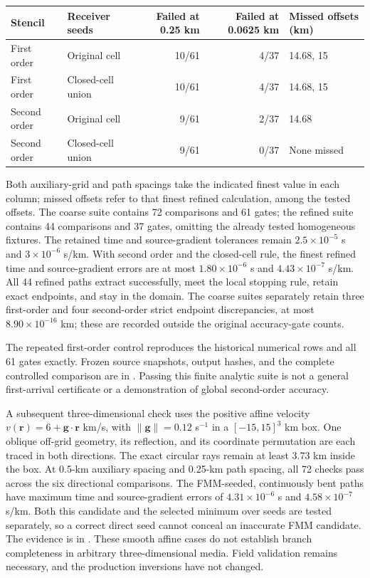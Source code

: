 \documentclass[11pt]{article}
\begin{document}
\begin{center}
\begin{tabular}{llrrl}
\toprule
Stencil & Receiver seeds & Failed at 0.25 km & Failed at 0.0625 km & Missed offsets (km)\\
\midrule
First order & Original cell & 10/61 & 4/37 & 14.68, 15\\
First order & Closed-cell union & 10/61 & 4/37 & 14.68, 15\\
Second order & Original cell & 9/61 & 2/37 & 14.68\\
Second order & Closed-cell union & 9/61 & 0/37 & None missed\\
\bottomrule
\end{tabular}
\end{center}
Both auxiliary-grid and path spacings take the indicated finest value in
each column; missed offsets refer to that finest refined calculation,
among the tested offsets.
The coarse suite contains 72 comparisons and 61 gates; the refined suite
contains 44 comparisons and 37 gates, omitting the already tested homogeneous
fixtures. The retained time and source-gradient tolerances remain
$2.5\times10^{-5}$ s and $3\times10^{-6}$ s/km.
With second order and the closed-cell rule, the finest refined time and
source-gradient errors are at most $1.80\times10^{-6}$ s and
$4.43\times10^{-7}$ s/km. All 44 refined paths extract successfully,
meet the local stopping rule, retain exact endpoints, and stay in the domain.
The coarse suites separately retain three first-order and four second-order
strict endpoint discrepancies, at most $8.90\times10^{-16}$ km; these are
recorded outside the original accuracy-gate counts.

The repeated first-order control reproduces the historical numerical rows
and all 61 gates exactly. Frozen source snapshots, output hashes, and the
complete controlled comparison are in
. Passing this finite
analytic suite is not a general first-arrival certificate or a demonstration
of global second-order accuracy.

A subsequent three-dimensional check uses the positive affine velocity
$v(\mathbf r)=6+\mathbf g\cdot\mathbf r$ km/s, with
$\lVert\mathbf g\rVert=0.12$ s$^{-1}$ in a $[-15,15]^3$ km box.
One oblique off-grid geometry, its reflection, and its coordinate permutation
are each traced in both directions. The exact circular rays remain at least
3.73 km inside the box. At 0.5-km auxiliary spacing and 0.25-km path spacing,
all 72 checks pass across the six directional comparisons. The FMM-seeded,
continuously bent paths have maximum time and source-gradient errors of
$4.31\times10^{-6}$ s and $4.58\times10^{-7}$ s/km. Both this candidate
and the selected minimum over seeds are tested separately, so a correct
direct seed cannot conceal an inaccurate FMM candidate. The evidence is in
.
These smooth affine cases do not establish branch completeness in arbitrary
three-dimensional media. Field validation remains necessary, and the
production inversions have not changed.
\end{document}
